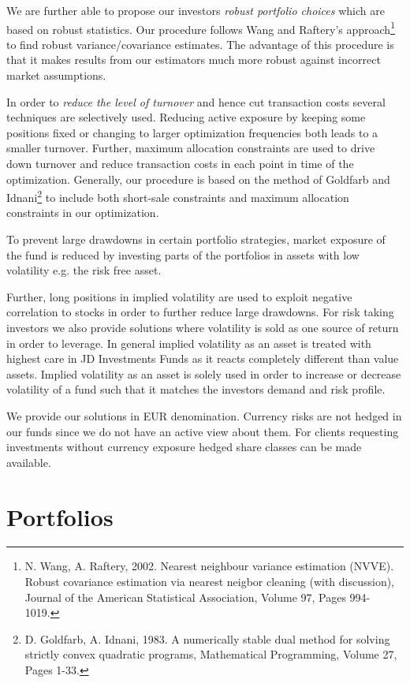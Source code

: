 \documentclass[11pt, parskip=full, DIV=14]{scrreprt}
\begin{document}
We are further able to propose our investors \textit{robust portfolio choices} which are based on robust statistics.
Our procedure follows Wang and Raftery’s approach\footnote{N. Wang, A. Raftery, 2002. Nearest neighbour variance estimation (NVVE). Robust covariance estimation via nearest neigbor cleaning (with discussion), Journal of the American Statistical Association, Volume 97, Pages 994-1019.} to find robust variance/covariance estimates.
The advantage of this procedure is that it makes results from our estimators much more robust against incorrect market assumptions.

In order to \textit{reduce the level of turnover} and hence cut transaction costs several techniques are selectively used.
Reducing active exposure by keeping some positions fixed or changing to larger optimization frequencies both leads to a smaller turnover.
Further, maximum allocation constraints are used to drive down turnover and reduce transaction costs in each point in time of the optimization.
Generally, our procedure is based on the method of Goldfarb and Idnani\footnote{D. Goldfarb, A. Idnani, 1983. A numerically stable dual method for solving strictly convex quadratic programs, Mathematical Programming, Volume 27, Pages 1-33.} to include both short-sale constraints and maximum allocation constraints in our optimization.

To prevent large drawdowns in certain portfolio strategies, market exposure of the fund is reduced by investing parts of the portfolios in assets with low volatility e.g. the risk free asset.

Further, long positions in implied volatility are used to exploit negative correlation to stocks in order to further reduce large drawdowns.
For risk taking investors we also provide solutions where volatility is sold as one source of return in order to leverage.
In general implied volatility as an asset is treated with highest care in JD Investments Funds as it reacts completely different than value assets.
Implied volatility as an asset is solely used in order to increase or decrease volatility of a fund such that it matches the investors demand and risk profile.

We provide our solutions in EUR denomination.
Currency risks are not hedged in our funds since we do not have an active view about them.
For clients requesting investments without currency exposure hedged share classes can be made available.

\chapter{Portfolios}
\end{document}
